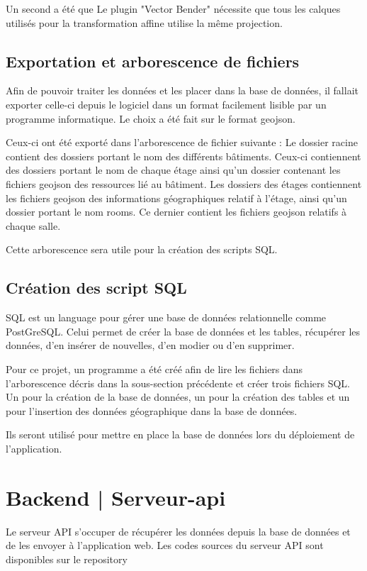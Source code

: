 \documentclass[
    iai, %
    il, %
]{heig-tb}
\begin{document}
Un second a été que Le plugin "Vector Bender" nécessite que tous les calques utilisés pour la transformation affine utilise la même projection.

\subsection{Exportation et arborescence de fichiers}
Afin de pouvoir traiter les données et les placer dans la base de données,
il fallait exporter celle-ci depuis le logiciel dans un format facilement lisible par un programme informatique.
Le choix a été fait sur le format \gls{geojson}.

Ceux-ci ont été exporté dans l'arborescence de fichier suivante :
Le dossier racine contient des dossiers portant le nom des différents bâtiments.
Ceux-ci contiennent des dossiers portant le nom de chaque étage ainsi qu'un dossier contenant les fichiers \gls{geojson} des ressources lié au bâtiment.
Les dossiers des étages contiennent les fichiers \gls{geojson} des informations géographiques relatif à l'étage, ainsi qu'un dossier portant le nom rooms.
Ce dernier contient les fichiers \gls{geojson} relatifs à chaque salle.

Cette arborescence sera utile pour la création des scripts SQL.

\subsection{Création des script SQL}
SQL est un language pour gérer une base de données relationnelle comme PostGreSQL.
Celui permet de créer la base de données et les tables, récupérer les données, d'en insérer de nouvelles, d'en modier ou d'en supprimer.

Pour ce projet, un programme  a été créé afin de lire les fichiers dans l'arborescence décris dans la sous-section précédente
et créer trois fichiers SQL. Un pour la création de la base de données, un pour la création des tables et un pour l'insertion des données géographique dans la base de données.

Ils seront utilisé pour mettre en place la base de données lors du déploiement de l'application.

\section{Backend | Serveur-api}
Le serveur API s'occuper de récupérer les données depuis la base de données et de les envoyer à l'application web.
Les codes sources du serveur API sont disponibles sur le repository
\end{document}
